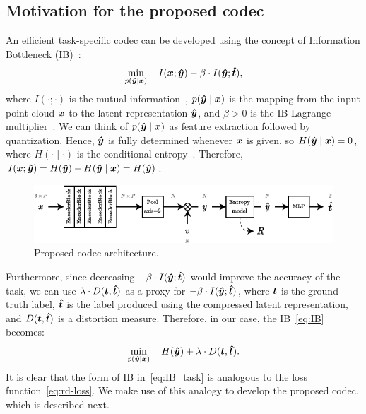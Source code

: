 \subsection{Motivation for the proposed codec}

An efficient task-specific codec can be developed using the concept of Information Bottleneck (IB)~\cite{IB_Allerton1999}:
\begin{equation}
  \min_{p({\boldsymbol{\hat{y}}} \mid {\boldsymbol{x}})} \quad I({\boldsymbol{x}}; {\boldsymbol{\hat{y}}}) - \beta \cdot I({\boldsymbol{\hat{y}}} ; {\boldsymbol{\hat{t}}}),
\label{eq:IB}
\end{equation}
where $I(\cdot;\cdot)$ is the mutual information~\cite{Cover_Thomas_2006}, $p({\boldsymbol{\hat{y}}} \mid {\boldsymbol{x}})$ is the mapping from the input point cloud ${\boldsymbol{x}}$ to the latent representation ${\boldsymbol{\hat{y}}}$, and $\beta>0$ is the IB Lagrange multiplier~\cite{IB_Allerton1999}.
We can think of $p({\boldsymbol{\hat{y}}} \mid {\boldsymbol{x}})$ as feature extraction followed by quantization.
Hence, ${\boldsymbol{\hat{y}}}$ is fully determined whenever ${\boldsymbol{x}}$ is given, so $H({\boldsymbol{\hat{y}}} \mid {\boldsymbol{x}}) = 0$, where $H(\cdot \mid \cdot)$ is the conditional entropy~\cite{Cover_Thomas_2006}.
Therefore, $I({\boldsymbol{x}}; {\boldsymbol{\hat{y}}}) = H({\boldsymbol{\hat{y}}}) - H({\boldsymbol{\hat{y}}} \mid {\boldsymbol{x}}) = H({\boldsymbol{\hat{y}}})$.

\begin{figure}[tbp]
  \centering
  \includegraphics[width=0.7\linewidth]{img/point_cloud_compression/arch/proposed-full.pdf}
  \caption{Proposed codec architecture.}
  \label{fig:arch-proposed-full}
\end{figure}

Furthermore, since decreasing $-\beta\cdot I({\boldsymbol{\hat{y}}} ; {\boldsymbol{\hat{t}}})$ would improve the accuracy of the task, we can use $\lambda \cdot D({\boldsymbol{t}},{\boldsymbol{\hat{t}}})$ as a proxy for $-\beta\cdot I({\boldsymbol{\hat{y}}} ; {\boldsymbol{\hat{t}}})$, where ${\boldsymbol{t}}$ is the ground-truth label, ${\boldsymbol{\hat{t}}}$ is the label produced using the compressed latent representation, and $D({\boldsymbol{t}},{\boldsymbol{\hat{t}}})$ is a distortion measure.
Therefore, in our case, the IB~\eqref{eq:IB} becomes:
\begin{equation}
  \min_{p({\boldsymbol{\hat{y}}} \mid {\boldsymbol{x}})} \quad H({\boldsymbol{\hat{y}}}) + \lambda \cdot D({\boldsymbol{t}},{\boldsymbol{\hat{t}}}).
\label{eq:IB_task}
\end{equation}
It is clear that the form of IB in~\eqref{eq:IB_task} is analogous to the loss function~\eqref{eq:rd-loss}.
We make use of this analogy to develop the proposed codec, which is described next.



